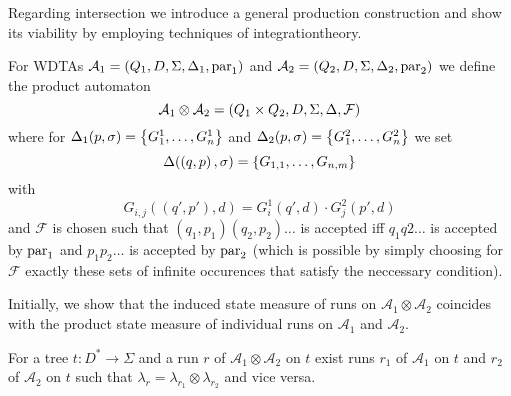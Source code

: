 Regarding intersection we introduce a general production construction and show
its viability by employing techniques of integrationtheory.
\begin{definition}
  For \acp{WDTA}
  $\mathcal{A}_{1} = \left(Q_{1}, D, \Sigma, \Delta_{1}, \operatorname{par}_{1}\right)$ and
  $\mathcal{A}_{2} = \left(Q_{2}, D, \Sigma, \Delta_{2}, \operatorname{par}_{2}\right)$ we
  define the product automaton
  \begin{equation*}
    \mathcal{A}_{1}\otimes\mathcal{A}_{2} = \left(Q_{1}\times Q_{2}, D,
    \Sigma, \Delta, \mathcal{F}\right)
  \end{equation*}
  where for $\Delta_{1}(p, \sigma) = \left\{G^{1}_{1},\dots,G^{1}_{n}\right\}$ and
  $\Delta_{2}(p, \sigma) = \left\{G^{2}_{1},\dots,G^{2}_{n}\right\}$ we set
  \begin{equation*}
    \Delta(\left(q, p\right), \sigma) = \left\{G_{1, 1},\dots, G_{n, m}\right\}
  \end{equation*}
  with
  \begin{equation*}
    G_{i, j}((q', p'), d) = G_{i}^{1}(q', d)\cdot G_{j}^{2}(p', d)
  \end{equation*}
  and $\mathcal{F}$ is chosen such that $(q_{1}, p_{1})(q_{2}, p_{2})\dots$ is
  accepted iff $q_{1}q{2}\dots$ is accepted by $\operatorname{par}_{1}$ and
  $p_{1}p_{2}\dots$ is accepted by $\operatorname{par}_{2}$ (which is possible by simply
  choosing for $\mathcal{F}$ exactly these sets of infinite occurences that
  satisfy the neccessary condition).
\end{definition}
Initially, we show that the induced state measure of runs on
$\mathcal{A}_{1}\otimes\mathcal{A}_{2}$ coincides with the product state
measure of individual runs on $\mathcal{A}_{1}$ and $\mathcal{A}_{2}$.
\begin{lemma}
  For a tree $t:D^{*}\rightarrow \Sigma$ and a run $r$ of
  $\mathcal{A}_{1}\otimes\mathcal{A}_{2}$ on $t$ exist runs $r_{1}$ of
  $\mathcal{A}_{1}$ on $t$ and $r_{2}$ of $\mathcal{A}_{2}$ on $t$ such that
  $\lambda_{r} = \lambda_{r_{1}}\otimes\lambda_{r_{2}}$ and vice versa.
\end{lemma}
